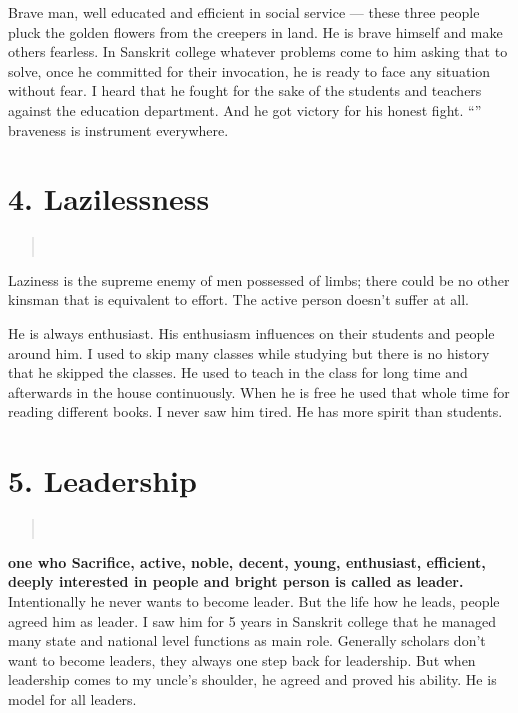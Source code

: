 \noindent
Brave man, well educated and efficient in social service --- these three people pluck the golden flowers from the creepers in land.
He is brave himself and make others fearless. In Sanskrit college whatever problems come to him asking that to solve, once he committed for their invocation, he is ready to face any situation without fear. I heard that he fought for the sake of the students and teachers against the education department. And he got victory for his honest fight. “” braveness is instrument everywhere.

\section*{4. Lazilessness }

\begin{verse}
\\
\end{verse}
\vskip -6pt

\noindent
Laziness is the supreme enemy of men possessed of limbs; there could be no other kinsman that is equivalent to effort. The active person doesn’t suffer at all.

He is always enthusiast. His enthusiasm influences on their students and people around him. I used to skip many classes while studying but there is no history that he skipped the classes. He used to teach in the class for long time and afterwards in the house continuously. When he is free he used that whole time for reading different books. I never saw him tired. He has more spirit than students.

\section*{5. Leadership }

\begin{verse}
\\
\end{verse}
\textbf{one who Sacrifice, active, noble, decent, young, enthusiast, efficient, deeply interested in people and bright person is called as leader.}
Intentionally he never wants to become leader. But the life how he leads, people agreed him as leader. I saw him for 5 years in Sanskrit college that he managed many state and national level functions as main role. Generally scholars don’t want to become leaders, they always one step back for leadership. But when leadership comes to my uncle’s shoulder, he agreed and proved his ability. He is model for all leaders.

